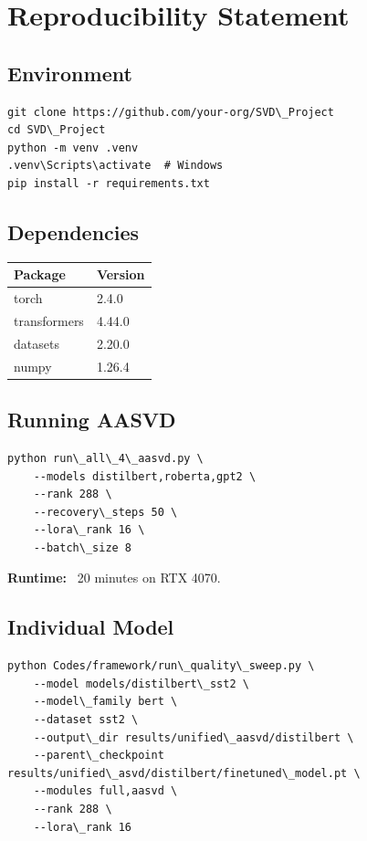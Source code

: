 
\section{Reproducibility Statement}

\subsection{Environment}

\begin{lstlisting}
git clone https://github.com/your-org/SVD\_Project
cd SVD\_Project
python -m venv .venv
.venv\Scripts\activate  # Windows
pip install -r requirements.txt
\end{lstlisting}

\subsection{Dependencies}

\begin{table}[H]
\centering
\small
\begin{tabular}{ll}
\toprule
\textbf{Package} & \textbf{Version} \\
\midrule
torch & 2.4.0 \\
transformers & 4.44.0 \\
datasets & 2.20.0 \\
numpy & 1.26.4 \\
\bottomrule
\end{tabular}
\end{table}

\subsection{Running AASVD}

\begin{lstlisting}
python run\_all\_4\_aasvd.py \
    --models distilbert,roberta,gpt2 \
    --rank 288 \
    --recovery\_steps 50 \
    --lora\_rank 16 \
    --batch\_size 8
\end{lstlisting}

\textbf{Runtime:} ~20 minutes on RTX 4070.

\subsection{Individual Model}

\begin{lstlisting}
python Codes/framework/run\_quality\_sweep.py \
    --model models/distilbert\_sst2 \
    --model\_family bert \
    --dataset sst2 \
    --output\_dir results/unified\_aasvd/distilbert \
    --parent\_checkpoint results/unified\_asvd/distilbert/finetuned\_model.pt \
    --modules full,aasvd \
    --rank 288 \
    --lora\_rank 16
\end{lstlisting}

